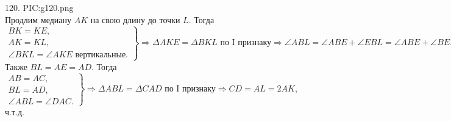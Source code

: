 120. {{PIC:g120.png}}\\
Продлим медиану $AK$ на свою длину до точки $L.$ Тогда $\left.\begin{array}{l}BK=KE,\\
AK=KL,\\
\angle BKL=\angle AKE\text{ вертикальные.} \end{array}\right\}\Rightarrow \Delta AKE=\Delta BKL\text{ по I признаку}\Rightarrow
\angle ABL=\angle ABE+\angle EBL=\angle ABE+\angle BEA=\angle DAC.$ Также  $BL=AE=AD.$ Тогда
$\left.\begin{array}{l}AB=AC,\\
BL=AD,\\
\angle ABL=\angle DAC. \end{array}\right\}\Rightarrow \Delta ABL=\Delta CAD\text{ по I признаку}\Rightarrow CD=AL=2AK,$ ч.т.д.\newpage\noindent
